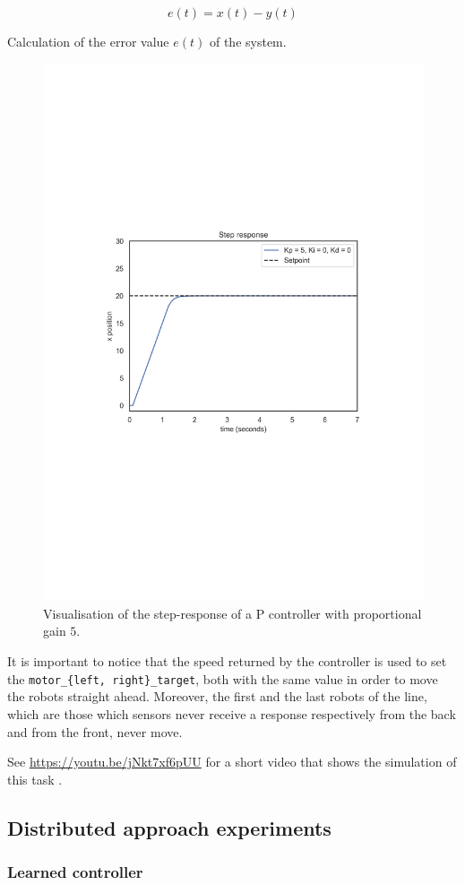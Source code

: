 \begin{Equation}[!h]
	\centering
	\begin{equation}
	e(t) = x(t) - y(t)
	\end{equation}
	\caption{Calculation of the error value $e(t)$ of the system.}
	\label{eq:systemerror}
\end{Equation}

\begin{figure}[htb]
	\centering
	\includegraphics[width=.5\textwidth]{contents/images/Step-responsep=kp5ki0kd0}
	\caption[Step response of the proportinal PID controller.]{Visualisation of the 
	step-response of a P controller with proportional 
	gain $5$.}
	\label{fig:pid}
\end{figure}

It is important to notice that the speed returned by the controller is used to set the 
\texttt{motor\_\{left, right\}\_target}, both with the same value in order to move 
the robots straight ahead. Moreover, the first and the last robots of the line, which 
are those which sensors never receive a response respectively from the back and 
from the front, never move.

See \url{https://youtu.be/jNkt7xf6pUU} for a short video that shows the 
simulation of this task \cite[][]{task1manual}.


\subsection{Distributed approach experiments}
\label{subsec:ex1distr}


\subsubsection{Learned controller}
\label{subsubsec:learneddist}



